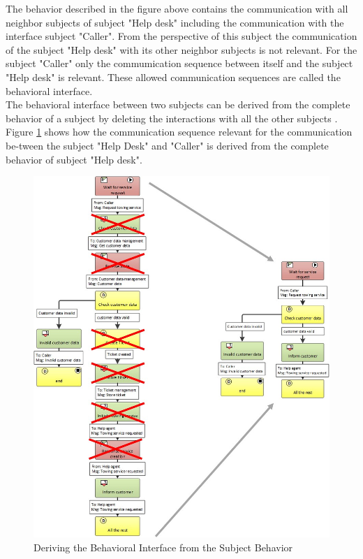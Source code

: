 The behavior described in the figure above contains the communication with all neighbor subjects of subject "Help desk" including the communication with the interface subject "Caller". From the perspective of this subject the communication of the subject "Help desk" with its other neighbor subjects is not relevant. For the subject "Caller" only the commumication sequence between itself and the subject "Help desk" is relevant. These allowed communication sequences are called the behavioral interface.\\
The behavioral interface between two subjects can be derived from the complete behavior of a subject by deleting the interactions with all the other subjects . Figure \ref{fig:car-service-lev10} shows how the communication sequence relevant for the communication be-tween the subject "Help Desk" and "Caller" is derived from the complete behavior of subject "Help desk".

\begin{figure}[htbp]
	\centering
	\includegraphics[width=1.0\linewidth]{Figures/Chapter5/figures-hierarchy/Car-Service-Lev10}
	\caption[Deriving the Behavioral Interface from the Subject Behavior]{Deriving the Behavioral Interface from the Subject Behavior}
	\label{fig:car-service-lev10}
\end{figure}

